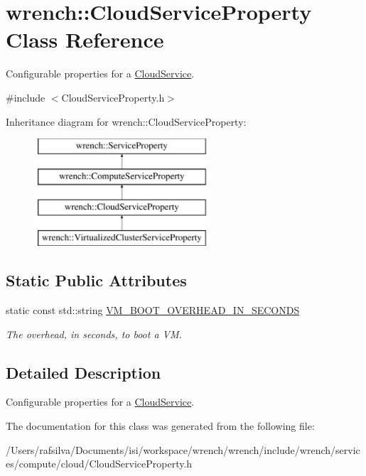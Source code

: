 \hypertarget{classwrench_1_1_cloud_service_property}{}\section{wrench\+:\+:Cloud\+Service\+Property Class Reference}
\label{classwrench_1_1_cloud_service_property}


Configurable properties for a \hyperlink{classwrench_1_1_cloud_service}{Cloud\+Service}.  




{\ttfamily \#include $<$Cloud\+Service\+Property.\+h$>$}

Inheritance diagram for wrench\+:\+:Cloud\+Service\+Property\+:\begin{figure}[H]
\begin{center}
\leavevmode
\includegraphics[height=4.000000cm]{classwrench_1_1_cloud_service_property}
\end{center}
\end{figure}
\subsection*{Static Public Attributes}
\begin{DoxyCompactItemize}
\item 
\mbox{\label{classwrench_1_1_cloud_service_property_a7e2fddc7f539dedff89fb41635a5b200}} 
static const std\+::string \hyperlink{classwrench_1_1_cloud_service_property_a7e2fddc7f539dedff89fb41635a5b200}{V\+M\+\_\+\+B\+O\+O\+T\+\_\+\+O\+V\+E\+R\+H\+E\+A\+D\+\_\+\+I\+N\+\_\+\+S\+E\+C\+O\+N\+DS}
\begin{DoxyCompactList}\small\item\em The overhead, in seconds, to boot a VM. \end{DoxyCompactList}\end{DoxyCompactItemize}


\subsection{Detailed Description}
Configurable properties for a \hyperlink{classwrench_1_1_cloud_service}{Cloud\+Service}. 

The documentation for this class was generated from the following file\+:\begin{DoxyCompactItemize}
\item 
/\+Users/rafsilva/\+Documents/isi/workspace/wrench/wrench/include/wrench/services/compute/cloud/Cloud\+Service\+Property.\+h\end{DoxyCompactItemize}
